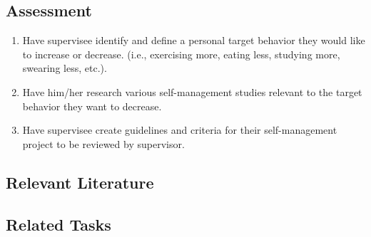 \subsection{Assessment}
\begin{enumerate}
\item Have supervisee identify and define a personal target behavior they would like to increase or decrease. (i.e., exercising more, eating less, studying more, swearing less, etc.). 
\item Have him/her research various self-management studies relevant to the target behavior they want to decrease. 
\item Have supervisee create guidelines and criteria for their self-management project to be reviewed by supervisor. 
\end{enumerate}
%
\subsection{Relevant Literature}
\begin{refsection}
\nocite{test,alang2017police,clayton2018black}
\printbibliography[heading=none]
\end{refsection}
%
\subsection{Related Tasks}
\fourbThree{}\\ 
\fourfTwo{}\\
\fouriOne{}\\
\fouriSix{}\\
\fourjOne{}\\
\fourjTwo{}\\
\fourjTen{}\\
\fourFKEighteen{}\\
\fourFKTwenty{}\\
\fourFKThirtyOne{}\\
%
%
%
%
%
%
%
%
